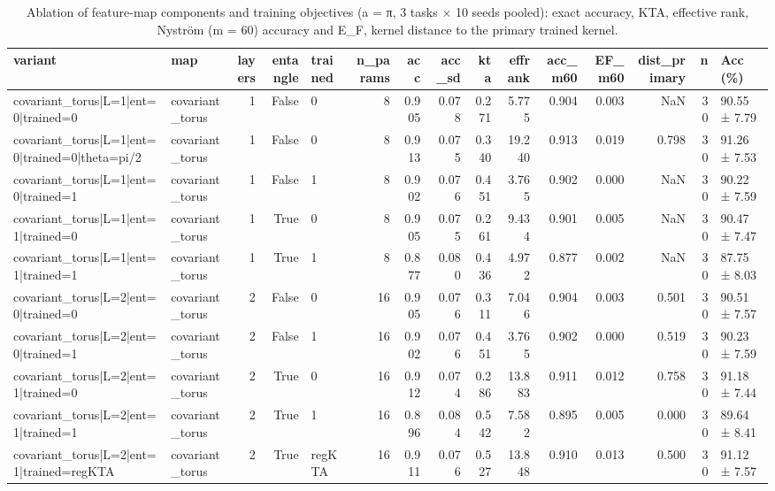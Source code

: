 \begin{table}
\caption{Ablation of feature-map components and training objectives (a = π, 3 tasks × 10 seeds pooled): exact accuracy, KTA, effective rank, Nyström (m = 60) accuracy and E_F, kernel distance to the primary trained kernel.}
\label{tab:table3_ablation}
\begin{tabular}{llrrlrrrrrrrrrl}
\toprule
variant & map & layers & entangle & trained & n\_params & acc & acc\_sd & kta & effrank & acc\_m60 & EF\_m60 & dist\_primary & n & Acc (\%) \\
\midrule
covariant\_torus|L=1|ent=0|trained=0 & covariant\_torus & 1 & False & 0 & 8 & 0.905 & 0.078 & 0.271 & 5.775 & 0.904 & 0.003 & NaN & 30 & 90.55 ± 7.79 \\
covariant\_torus|L=1|ent=0|trained=0|theta=pi/2 & covariant\_torus & 1 & False & 0 & 8 & 0.913 & 0.075 & 0.340 & 19.240 & 0.913 & 0.019 & 0.798 & 30 & 91.26 ± 7.53 \\
covariant\_torus|L=1|ent=0|trained=1 & covariant\_torus & 1 & False & 1 & 8 & 0.902 & 0.076 & 0.451 & 3.765 & 0.902 & 0.000 & NaN & 30 & 90.22 ± 7.59 \\
covariant\_torus|L=1|ent=1|trained=0 & covariant\_torus & 1 & True & 0 & 8 & 0.905 & 0.075 & 0.261 & 9.434 & 0.901 & 0.005 & NaN & 30 & 90.47 ± 7.47 \\
covariant\_torus|L=1|ent=1|trained=1 & covariant\_torus & 1 & True & 1 & 8 & 0.877 & 0.080 & 0.436 & 4.972 & 0.877 & 0.002 & NaN & 30 & 87.75 ± 8.03 \\
covariant\_torus|L=2|ent=0|trained=0 & covariant\_torus & 2 & False & 0 & 16 & 0.905 & 0.076 & 0.311 & 7.046 & 0.904 & 0.003 & 0.501 & 30 & 90.51 ± 7.57 \\
covariant\_torus|L=2|ent=0|trained=1 & covariant\_torus & 2 & False & 1 & 16 & 0.902 & 0.076 & 0.451 & 3.765 & 0.902 & 0.000 & 0.519 & 30 & 90.23 ± 7.59 \\
covariant\_torus|L=2|ent=1|trained=0 & covariant\_torus & 2 & True & 0 & 16 & 0.912 & 0.074 & 0.286 & 13.883 & 0.911 & 0.012 & 0.758 & 30 & 91.18 ± 7.44 \\
covariant\_torus|L=2|ent=1|trained=1 & covariant\_torus & 2 & True & 1 & 16 & 0.896 & 0.084 & 0.542 & 7.582 & 0.895 & 0.005 & 0.000 & 30 & 89.64 ± 8.41 \\
covariant\_torus|L=2|ent=1|trained=regKTA & covariant\_torus & 2 & True & regKTA & 16 & 0.911 & 0.076 & 0.527 & 13.848 & 0.910 & 0.013 & 0.500 & 30 & 91.12 ± 7.57 \\

\end{tabular}
\end{table}
